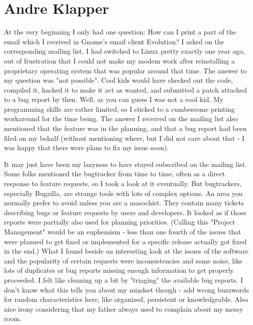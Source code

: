 \section{Andre Klapper}
At the very beginning I only had one question: How can I print a part of the email which I received in Gnome's email client Evolution? I asked on the corresponding mailing list.
I had switched to Linux pretty exactly one year ago, out of frustration that I could not make my modem work after reinstalling a proprietary operating system that was popular around that time.
The answer to my question was "not possible". Cool kids would have checked out the code, compiled it, hacked it to make it act as wanted, and submitted a patch attached to a bug report by then. Well, as you can guess I was not a cool kid. My programming skills are rather limited, so I sticked to a cumbersome printing workaround for the time being. The answer I received on the mailing list also mentioned that the feature was in the planning, and that a bug report had been filed on my behalf (without mentioning where, but I did not care about that - I was happy that there were plans to fix my issue soon).

It may just have been my lazyness to have stayed subscribed on the mailing list. Some folks mentioned the bugtracker from time to time, often as a direct response to feature requests, so I took a look at it eventually. But bugtrackers, especially Bugzilla, are strange tools with lots of complex options. An area you normally prefer to avoid unless you are a masochist. They contain many tickets describing bugs or feature requests by users and developers. It looked as if those reports were partially also used for planning priorities. (Calling this "Project Management" would be an euphemism - less than one fourth of the issues that were planned to get fixed or implemented for a specific release actually got fixed in the end.)
What I found beside an interesting look at the issues of the software and the popularity of certain requests were inconsistencies and some noise, like lots of duplicates or bug reports missing enough information to get properly proceeded. I felt like cleaning up a bit by "triaging" the available bug reports. I don't know what this tells you about my mindset though - add wrong buzzwords for random characteristics here, like organized, persistent or knowledgeable. Also nice irony considering that my father always used to complain about my messy room.

